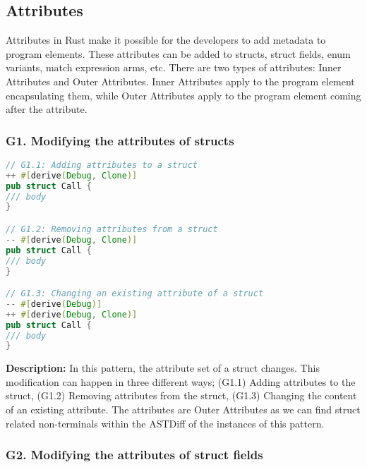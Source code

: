 

\subsection{Attributes}

Attributes in Rust make it possible for the developers to add metadata to program elements. These attributes can be added to structs, struct fields, enum variants, match expression arms, etc. There are two types of attributes: Inner Attributes and Outer Attributes. Inner Attributes apply to the program element encapsulating them, while Outer Attributes apply to the program element coming after the attribute. %

\subsubsection{G1. Modifying the attributes of structs}

\begin{lstlisting}[language=Rust, style=colouredRust, label={l3}]
// G1.1: Adding attributes to a struct
++ #[derive(Debug, Clone)]
pub struct Call {
/// body 
}

// G1.2: Removing attributes from a struct
-- #[derive(Debug, Clone)]
pub struct Call {
/// body 
}

// G1.3: Changing an existing attribute of a struct
-- #[derive(Debug)]
++ #[derive(Debug, Clone)]
pub struct Call {
/// body 
}
\end{lstlisting}

\noindent \textbf{Description:} In this pattern, the attribute set of a struct changes. This modification can happen in three different ways; (G1.1) Adding attributes to the struct, (G1.2) Removing attributes from the struct, (G1.3) Changing the content of an existing attribute. The attributes are Outer Attributes as we can find struct related non-terminals within the ASTDiff of the instances of this pattern.

\subsubsection{G2. Modifying the attributes of struct fields}

